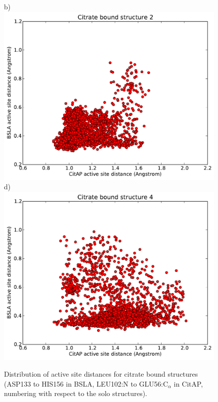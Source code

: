 \documentclass[english, a4paper, 12pt, titlepage, draft]{article}
\begin{document}
\begin{figure}
\begin{minipage}[]{0.45\linewidth}
        \centering
        b)
        \includegraphics[width=\textwidth]{figures/CitAP_BSLA_distance/BSLA_CitAP_distance_bound_structure2.pdf}  
        d)
        \includegraphics[width=\textwidth]{figures/CitAP_BSLA_distance/BSLA_CitAP_distance_bound_structure4.pdf}  
    \end{minipage}
    \caption{Distribution of active site distances for citrate bound structures (ASP133 to HIS156 in BSLA, LEU102:N to GLU56:C$_{\alpha}$ in CitAP, numbering with respect to the solo structures).}
\label{fig:active_site_bound_distribution}
\end{figure}      
\end{document}
